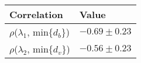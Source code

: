 \begin{table}[]
\begin{tabular}{ll}
\hline
Correlation                       & Value            \\ \hline
$\rho$($\lambda_1$, min$\{d_b\}$) & $-0.69 \pm 0.23$ \\
$\rho$($\lambda_2$, min$\{d_v\}$) & $-0.56 \pm 0.23$ \\ \hline
\end{tabular}
\end{table}